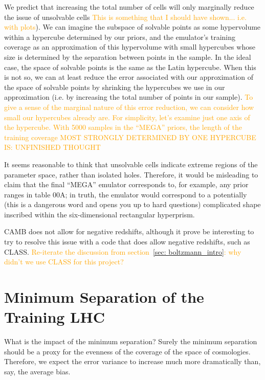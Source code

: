 We predict that increasing the total number of cells will only marginally
reduce the issue of unsolvable cells \textcolor{orange}{This is something that 
I should have shown... i.e. with plots}). We can imagine the subspace of
solvable points as some hypervolume within a hypercube determined by our
priors, and the emulator's training coverage as an approximation of this 
hypervolume with small hypercubes whose size is determined by the separation 
between points in the sample. In the ideal case, the space of solvable points 
is the same as the Latin hypercube. When this is not so, we can at least
reduce the error associated with our approximation of the space of solvable
points by shrinking the hypercubes we use in our approximation (i.e. by
increasing the total number of points in our sample). \textcolor{orange}{
To give a sense of the marginal nature of this error reduction, we can
consider how small our hypercubes already are. For simplicity, let's examine
just one axis of the hypercube. With 5000 samples in the ``MEGA'' priors,
the length of the training coverage MOST STRONGLY DETERMINED BY ONE HYPERCUBE
IS: UNFINISHED THOUGHT}

It seems reasonable to think that unsolvable cells indicate extreme regions of 
the parameter space, rather than isolated holes. Therefore, it would be 
misleading to claim that the final ``MEGA'' emulator corresponds to, for 
example, any prior ranges in table 00A; in truth, the emulator would 
correspond to a potentially (this is a dangerous word and opens you up to hard 
questions) complicated shape inscribed within the six-dimensional rectangular 
hyperprism.

CAMB does not allow for negative redshifts, although it prove be 
interesting to try to resolve this issue with a code that does allow negative 
redshifts, such as CLASS. \textcolor{orange}{Re-iterate the discussion from
section~\ref{sec: boltzmann_intro}: why didn’t we use CLASS for this project?}

\section{Minimum Separation of the Training LHC}
\label{sec: error_from_lhc}

What is the impact of the minimum separation? Surely the minimum separation
should be a proxy for the evenness of the coverage of the space of
cosmologies. Therefore, we expect the error variance to increase much more
dramatically than, say, the average bias.

